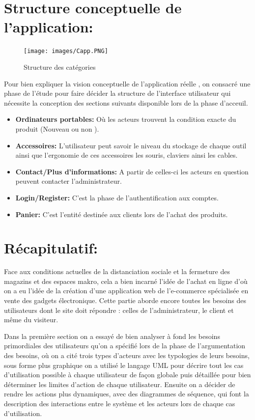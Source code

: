 \documentclass[a4paper]{report}
\begin{document}
\begin{doublespace}
\begin{doublespace}
\begin{doublespace}
\begin{doublespace}
\begin{doublespace}
\section{Structure conceptuelle de l'application:}
\begin{figure}[H]
\begin{center}
 \texttt{[image: images/Capp.PNG]}
 \caption{Structure des catégories}
 \end{center}
\end{figure}
Pour bien expliquer la vision conceptuelle de l'application réelle , on consacré une phase de l'étude pour faire décider la structure de l'interface utilisateur  qui nécessite la conception des  sections suivants  disponible lors de la phase d'acceuil.
\begin{itemize}
    \item \textbf{Ordinateurs portables:} Où les acteurs trouvent la condition exacte du produit (Nouveau ou non ).
    \item \textbf{Accessoires:} L'utilisateur peut savoir le niveau du stockage de chaque outil ainsi que l'ergonomie de ces accessoires les souris, claviers ainsi les cables.
    \item \textbf{Contact/Plus d'informations:} A partir de celles-ci les acteurs en question peuvent contacter l'administrateur.
    \item \textbf{Login/Register:} C'est la phase de l'authentification aux comptes.
    \item \textbf{Panier:} C'est l'entité destinée aux clients lors de l'achat des produits.
    
\end{itemize}


\newpage
\section{Récapitulatif:}
Face aux conditions actuelles de la distanciation sociale et la fermeture des magazins et des espaces makro, cela a bien incarné l'idée de l'achat en ligne d'où on a eu l'idée de la création d’une application web de l'e-commerce spécialisée en vente des gadgets électronique. Cette partie aborde encore toutes les besoins des utilisateurs dont le site doit répondre : celles de l’administrateur, le client  et même du visiteur.

Dans la première section on a essayé de bien analyser à fond les besoins primordiales des utilisateurs qu'on a spécifié lors de la phase de l'argumentation des besoins, où on a cité trois types d'acteurs avec les typologies de leurs besoins, sous forme plus graphique on a utilisé le langage UML pour décrire tout les cas d'utilisation possible à chaque utilisateur de façon globale puis  détaillée pour bien déterminer les limites d'action de chaque utilisateur.
Ensuite on a décider de rendre les actions plus dynamiques, avec des diagrammes de séquence, qui font la description des interactions entre le système et les acteurs lors de chaque cas d'utilisation. 






\end{doublespace}
\end{doublespace}
\end{doublespace}
\end{doublespace}
\end{doublespace}
\end{document}
